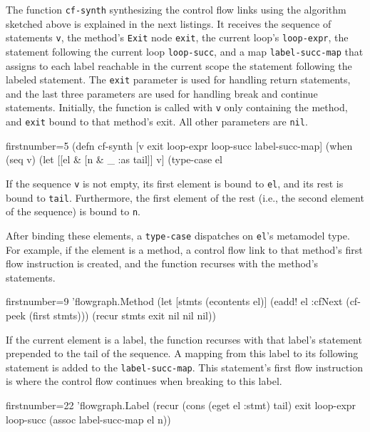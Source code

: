 \documentclass[submission]{eptcs}
\begin{document}
The function \verb|cf-synth| synthesizing the control flow links using the
algorithm sketched above is explained in the next listings.  It receives the
sequence of statements \verb|v|, the method's \verb|Exit| node \verb|exit|, the
current loop's \verb|loop-expr|, the statement following the current loop
\verb|loop-succ|, and a map \verb|label-succ-map| that assigns to each label
reachable in the current scope the statement following the labeled statement.
The \verb|exit| parameter is used for handling return statements, and the last
three parameters are used for handling break and continue statements.
Initially, the function is called with \verb|v| only containing the method, and
\verb|exit| bound to that method's exit.  All other parameters are \verb|nil|.

\begin{clojurecode*}{firstnumber=5}
(defn cf-synth [v exit loop-expr loop-succ label-succ-map]
  (when (seq v)
    (let [[el & [n & _ :as tail]] v]
      (type-case el
\end{clojurecode*}

If the sequence \verb|v| is not empty, its first element is bound to \verb|el|,
and its rest is bound to \verb|tail|.  Furthermore, the first element of the
rest (i.e., the second element of the sequence) is bound to \verb|n|.

After binding these elements, a \verb|type-case| dispatches on \verb|el|'s
metamodel type.  For example, if the element is a method, a control flow link
to that method's first flow instruction is created, and the function recurses
with the method's statements.

\begin{clojurecode*}{firstnumber=9}
        'flowgraph.Method (let [stmts (econtents el)]
                            (eadd! el :cfNext (cf-peek (first stmts)))
                            (recur stmts exit nil nil nil))
\end{clojurecode*}

If the current element is a label, the function recurses with that label's
statement prepended to the tail of the sequence.  A mapping from this label to
its following statement is added to the \verb|label-succ-map|.  This
statement's first flow instruction is where the control flow continues when
breaking to this label.

\begin{clojurecode*}{firstnumber=22}
        'flowgraph.Label (recur (cons (eget el :stmt) tail) exit loop-expr loop-succ
                                (assoc label-succ-map el n))
\end{clojurecode*}
\end{document}
